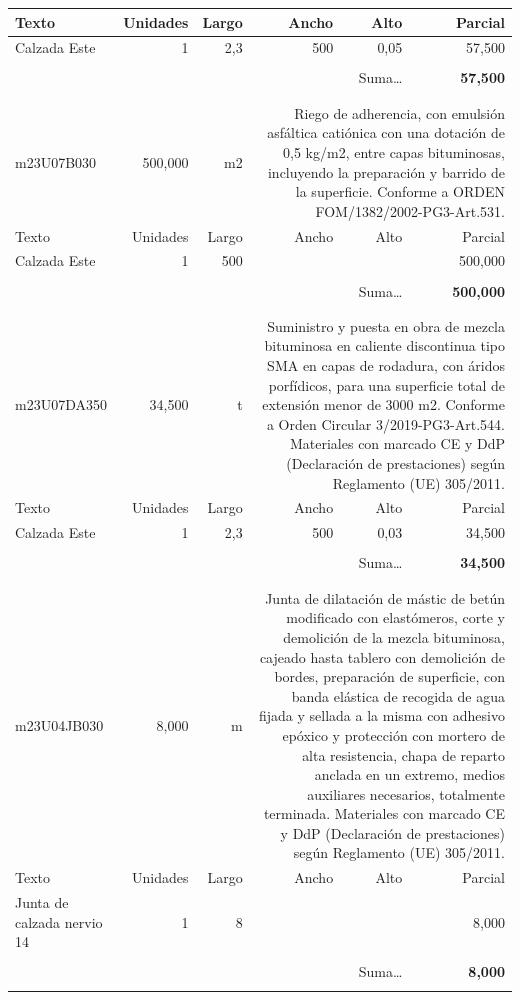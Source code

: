 \documentclass{book}%
\begin{document}
\begin{longtable}{lrrrrr}
Texto&Unidades&Largo&Ancho&Alto&Parcial\\%
\hline%
\multicolumn{1}{p{3.5cm}}{Calzada Este}&1&2,3&500&0,05&    57,500\\%
&&&&&\\%
\multicolumn{5}{r}{Suma\ldots}&\textbf{    57,500}\\%
\hline%
&&&&&\\%
&&&&&\\%
m23U07B030&   500,000& m2&\multicolumn{3}{p{6cm}}{\scriptsize Riego de adherencia, con emulsión asfáltica catiónica con una dotación de 0,5 kg/m2, entre capas bituminosas, incluyendo la preparación y barrido de la superficie. Conforme a ORDEN FOM/1382/2002-PG3-Art.531.\normalsize}\\%
Texto&Unidades&Largo&Ancho&Alto&Parcial\\%
\hline%
\multicolumn{1}{p{3.5cm}}{Calzada Este}&1&500&&&   500,000\\%
&&&&&\\%
\multicolumn{5}{r}{Suma\ldots}&\textbf{   500,000}\\%
\hline%
&&&&&\\%
&&&&&\\%
m23U07DA350&    34,500& t&\multicolumn{3}{p{6cm}}{\scriptsize Suministro y puesta en obra de mezcla bituminosa en caliente discontinua tipo SMA en capas de rodadura, con áridos porfídicos, para una superficie total de extensión menor de 3000 m2. Conforme a Orden Circular 3/2019-PG3-Art.544. Materiales con marcado CE y DdP (Declaración de prestaciones) según Reglamento (UE) 305/2011.\normalsize}\\%
Texto&Unidades&Largo&Ancho&Alto&Parcial\\%
\hline%
\multicolumn{1}{p{3.5cm}}{Calzada Este}&1&2,3&500&0,03&    34,500\\%
&&&&&\\%
\multicolumn{5}{r}{Suma\ldots}&\textbf{    34,500}\\%
\hline%
&&&&&\\%
&&&&&\\%
m23U04JB030&     8,000& m&\multicolumn{3}{p{6cm}}{\scriptsize Junta de dilatación de mástic de betún modificado con elastómeros, corte y demolición de la mezcla bituminosa, cajeado hasta tablero con demolición de bordes, preparación de superficie, con banda elástica de recogida de agua fijada y sellada a la misma con adhesivo epóxico y protección con mortero de alta resistencia, chapa de reparto anclada en un extremo, medios auxiliares necesarios, totalmente terminada. Materiales con marcado CE y DdP (Declaración de prestaciones) según Reglamento (UE) 305/2011.\normalsize}\\%
Texto&Unidades&Largo&Ancho&Alto&Parcial\\%
\hline%
\multicolumn{1}{p{3.5cm}}{Junta de calzada nervio 14 }&1&8&&&     8,000\\%
&&&&&\\%
\multicolumn{5}{r}{Suma\ldots}&\textbf{     8,000}\\%
\hline%
&&&&&\\%
\end{longtable}%
\newpage
\end{document}
